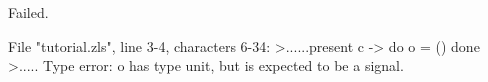 \runverbatimfalse
{}
\begin{RunVerbatimMsg}
Failed.
\end{RunVerbatimMsg}
\begin{RunVerbatimErr}
File "tutorial.zls", line 3-4, characters 6-34:
>......present c -> do o = () done
>.....
Type error: o has type
unit, but is expected to be a signal.
\end{RunVerbatimErr}
